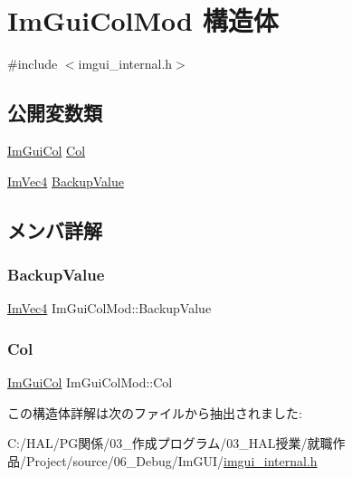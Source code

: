 \hypertarget{struct_im_gui_col_mod}{}\section{Im\+Gui\+Col\+Mod 構造体}
\label{struct_im_gui_col_mod}


{\ttfamily \#include $<$imgui\+\_\+internal.\+h$>$}

\subsection*{公開変数類}
\begin{DoxyCompactItemize}
\item 
\mbox{\hyperlink{imgui_8h_a1b0467ec582e731ae6292fef726fb5fe}{Im\+Gui\+Col}} \mbox{\hyperlink{struct_im_gui_col_mod_aaa66ad29c378b8800098ab4d4e1c91a6}{Col}}
\item 
\mbox{\hyperlink{struct_im_vec4}{Im\+Vec4}} \mbox{\hyperlink{struct_im_gui_col_mod_a7c23f178bbf5cbdb1333332bb84f73c9}{Backup\+Value}}
\end{DoxyCompactItemize}


\subsection{メンバ詳解}
\mbox{\label{struct_im_gui_col_mod_a7c23f178bbf5cbdb1333332bb84f73c9}} 
\subsubsection{\texorpdfstring{Backup\+Value}{BackupValue}}
{\footnotesize\ttfamily \mbox{\hyperlink{struct_im_vec4}{Im\+Vec4}} Im\+Gui\+Col\+Mod\+::\+Backup\+Value}

\mbox{\label{struct_im_gui_col_mod_aaa66ad29c378b8800098ab4d4e1c91a6}} 
\subsubsection{\texorpdfstring{Col}{Col}}
{\footnotesize\ttfamily \mbox{\hyperlink{imgui_8h_a1b0467ec582e731ae6292fef726fb5fe}{Im\+Gui\+Col}} Im\+Gui\+Col\+Mod\+::\+Col}



この構造体詳解は次のファイルから抽出されました\+:\begin{DoxyCompactItemize}
\item 
C\+:/\+H\+A\+L/\+P\+G関係/03\+\_\+作成プログラム/03\+\_\+\+H\+A\+L授業/就職作品/\+Project/source/06\+\_\+\+Debug/\+Im\+G\+U\+I/\mbox{\hyperlink{imgui__internal_8h}{imgui\+\_\+internal.\+h}}\end{DoxyCompactItemize}

